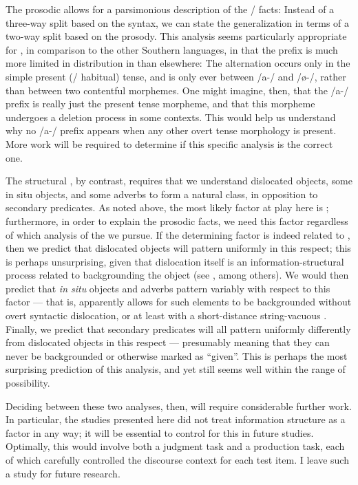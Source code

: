 \documentclass[output=paper,modfonts,nonflat,hidelinks]{langsci/langscibook}
\begin{document}
The prosodic  allows for a parsimonious description of the
 \slash {} facts: Instead of a three-way split based on the
syntax, we can state the generalization in terms of a two-way split based on
the prosody. This analysis seems particularly appropriate for , in
comparison to the other Southern  languages, in that the  prefix
is much more limited in distribution in  than elsewhere: The
alternation occurs only in the simple present (/ habitual) tense, and is only
ever between /a-/ and /\o-/, rather than between two contentful morphemes. One
might imagine, then, that the  /a-/ prefix is really just the present
tense morpheme, and that this morpheme undergoes a deletion process in some
contexts. This would help us understand why no /a-/ prefix appears when any
other overt tense morphology is present. More work will be required to
determine if this specific analysis is the correct one.

The structural , by contrast, requires that we understand
dislocated objects, some in situ objects, and some adverbs to form a
natural class, in opposition to secondary predicates. As noted above, the most
likely factor at play here is ; furthermore, in order to
explain the prosodic facts, we need this factor regardless of which analysis of
the  we pursue. If the determining factor is indeed related to
, then we predict that dislocated objects will pattern
uniformly in this respect; this is perhaps unsurprising, given that dislocation
itself is an information-structural process related to backgrounding the object
(see \citealt{Buell2005}, among others). We would then predict that \textit{in
situ} objects and adverbs pattern variably with respect to this factor --- that
is,  apparently allows for such elements to be backgrounded without
overt syntactic dislocation, or at least with a short-distance string-vacuous
. Finally, we predict that secondary predicates will all pattern
uniformly differently from dislocated objects in this respect --- presumably
meaning that they can never be backgrounded or otherwise marked as ``given''.
This is perhaps the most surprising prediction of this analysis, and yet still
seems well within the range of possibility.

Deciding between these two analyses, then, will require considerable further
work. In particular, the studies presented here did not treat information
structure as a factor in any way; it will be essential to control for
this in future studies. Optimally, this would involve both a judgment task and
a production task, each of which carefully controlled the discourse context for
each test item. I leave such a study for future research.
\end{document}
